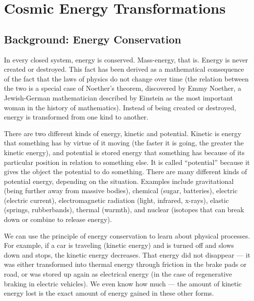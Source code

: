 \chapter{Cosmic Energy Transformations}


\section{Background: Energy Conservation}

In every closed system, energy is conserved. Mass-energy, that is. Energy is never created or destroyed. This fact has been derived as a mathematical consequence of the fact that the laws of physics do not change over time (the relation between the two is a special case of Noether's theorem, discovered by Emmy Noether, a Jewish-German mathematician described by Einstein as the most important woman in the history of mathematics). Instead of being created or destroyed, energy is transformed from one kind to another.

There are two different kinds of energy, kinetic and potential. Kinetic is energy that something has by virtue of it moving (the faster it is going, the greater the kinetic energy), and potential is stored energy that something has because of its particular position in relation to something else. It is called ``potential'' because it gives the object the potential to do something. There are many different kinds of potential energy, depending on the situation. Examples include gravitational (being further away from massive bodies), chemical (sugar, batteries), electric (electric current), electromagnetic radiation (light, infrared, x-rays), elastic (springs, rubberbands), thermal (warmth), and nuclear (isotopes that can break down or combine to release energy).

We can use the principle of energy conservation to learn about physical processes. For example, if a car is traveling (kinetic energy) and is turned off and slows down and stops, the kinetic energy decreases. That energy did not disappear --- it was either transformed into thermal energy through friction in the brake pads or road, or was stored up again as electrical energy (in the case of regenerative braking in electric vehicles). We even know how much --- the amount of kinetic energy lost is the exact amount of energy gained in these other forms.

